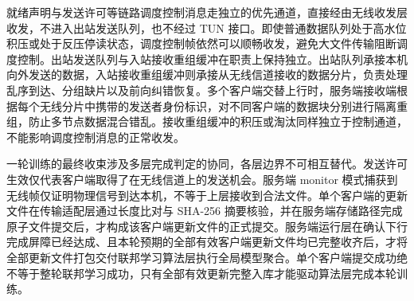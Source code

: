 就绪声明与发送许可等链路调度控制消息走独立的优先通道，直接经由无线收发层收发，不进入出站发送队列，也不经过 TUN 接口。即使普通数据队列处于高水位积压或处于反压停读状态，调度控制帧依然可以顺畅收发，避免大文件传输阻断调度控制。出站发送队列与入站接收重组缓冲在职责上保持独立。出站队列承接本机向外发送的数据，入站接收重组缓冲则承接从无线信道接收的数据分片，负责处理乱序到达、分组缺片以及前向纠错恢复。多个客户端交替上行时，服务端接收端根据每个无线分片中携带的发送者身份标识，对不同客户端的数据块分别进行隔离重组，防止多节点数据混合错乱。接收重组缓冲的积压或淘汰同样独立于控制通道，不能影响调度控制消息的正常收发。

一轮训练的最终收束涉及多层完成判定的协同，各层边界不可相互替代。发送许可生效仅代表客户端取得了在无线信道上的发送机会。服务端 monitor 模式捕获到无线帧仅证明物理信号到达本机，不等于上层接收到合法文件。单个客户端的更新文件在传输适配层通过长度比对与 SHA-256 摘要核验，并在服务端存储路径完成原子文件提交后，才构成该客户端更新文件的正式提交。服务端运行层在确认下行完成屏障已经达成、且本轮预期的全部有效客户端更新文件均已完整收齐后，才将全部更新文件打包交付联邦学习算法层执行全局模型聚合。单个客户端提交成功绝不等于整轮联邦学习成功，只有全部有效更新完整入库才能驱动算法层完成本轮训练。

